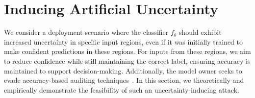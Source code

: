 \section{Inducing Artificial Uncertainty}

We consider a deployment scenario where the classifier \( f_\theta \) should exhibit increased uncertainty in specific input regions, even if it was initially trained to make confident predictions in these regions. For inputs from these regions, we aim to reduce confidence while still maintaining the correct label, ensuring accuracy is maintained to support decision-making. Additionally, the model owner seeks to evade accuracy-based auditing techniques~\citep{hardt2016equality}. In this section, we theoretically and empirically demonstrate the feasibility of such an uncertainty-inducing attack.





